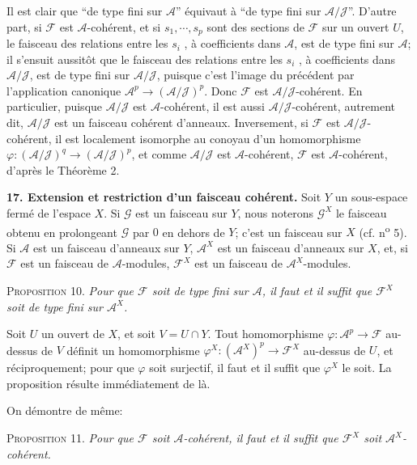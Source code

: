 Il est clair que ``de type fini sur $\mathcal{A}$'' équivaut à ``de type fini sur $\mathcal{A}/\mathcal{J}$''. D'autre part, si $\mathcal{F}$ est $\mathcal{A}$-cohérent, et si $s_1 , \cdots , s_p$ sont des sections de $\mathcal{F}$ sur un ouvert $U$, le faisceau des relations entre les $s_i$ , à coefficients dans $\mathcal{A}$, est de type fini sur $\mathcal{A}$; il s'ensuit aussitôt que le faisceau des relations entre les $s_i$ , à coefficients dans $\mathcal{A}/\mathcal{J}$, est de type fini sur $\mathcal{A}/\mathcal{J}$, puisque c'est l'image du précédent par l'application canonique $\mathcal{A}^p \to (\mathcal{A}/\mathcal{J})^p$. Donc $\mathcal{F}$ est $\mathcal{A}/\mathcal{J}$-cohérent. En particulier, puisque $\mathcal{A}/\mathcal{J}$ est $\mathcal{A}$-cohérent, il est aussi $\mathcal{A}/\mathcal{J}$-cohérent, autrement dit, $\mathcal{A}/\mathcal{J}$ est un faisceau cohérent d'anneaux. Inversement, si $\mathcal{F}$ est $\mathcal{A}/\mathcal{J}$-cohérent, il est localement isomorphe au conoyau d'un homomorphisme $\varphi : (\mathcal{A}/\mathcal{J})^q \to (\mathcal{A}/\mathcal{J})^p$, et comme $\mathcal{A}/\mathcal{J}$ est $\mathcal{A}$-cohérent, $\mathcal{F}$ est $\mathcal{A}$-cohérent, d'après le Théorème 2.

\textbf{17. Extension et restriction d'un faisceau cohérent.} Soit $Y$ un sous-espace fermé de l'espace $X$. Si $\mathcal{G}$ est un faisceau sur $Y$, nous noterons $\mathcal{G}^X$ le faisceau obtenu en prolongeant $\mathcal{G}$ par $0$ en dehors de $Y$; c'est un faisceau sur $X$ (cf. n\textsuperscript{o} 5). Si $\mathcal{A}$ est un faisceau d'anneaux sur $Y$, $\mathcal{A}^X$ est un faisceau d'anneaux sur $X$, et, si $\mathcal{F}$ est un faisceau de $\mathcal{A}$-modules, $\mathcal{F}^X$ est un faisceau de $\mathcal{A}^X$-modules.

\textsc{Proposition} 10. \textit{Pour que $\mathcal{F}$ soit de type fini sur $\mathcal{A}$, il faut et il suffit que $\mathcal{F}^X$ soit de type fini sur $\mathcal{A}^X$.}

Soit $U$ un ouvert de $X$, et soit $V = U \cap Y$. Tout homomorphisme $\varphi : \mathcal{A}^p \to \mathcal{F}$ au-dessus de $V$ définit un homomorphisme $\varphi^X : (\mathcal{A}^X)^p \to \mathcal{F}^X$ au-dessus de $U$,
et réciproquement; pour que $\varphi$ soit surjectif, il faut et il suffit que $\varphi^X$ le soit. La proposition résulte immédiatement de là.

On démontre de même:

\textsc{Proposition} 11. \textit{Pour que $\mathcal{F}$ soit $\mathcal{A}$-cohérent, il faut et il suffit que $\mathcal{F}^X$ soit $\mathcal{A}^X$-cohérent.}

